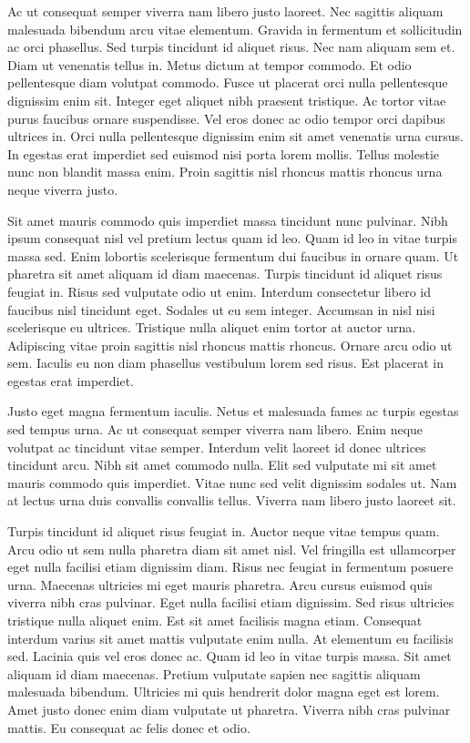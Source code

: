 \documentclass[11pt,a4paper]{article}
\begin{document}
Ac ut consequat semper viverra nam libero justo laoreet. Nec sagittis aliquam malesuada bibendum arcu vitae elementum. Gravida in fermentum et sollicitudin ac orci phasellus. Sed turpis tincidunt id aliquet risus. Nec nam aliquam sem et. Diam ut venenatis tellus in. Metus dictum at tempor commodo. Et odio pellentesque diam volutpat commodo. Fusce ut placerat orci nulla pellentesque dignissim enim sit. Integer eget aliquet nibh praesent tristique. Ac tortor vitae purus faucibus ornare suspendisse. Vel eros donec ac odio tempor orci dapibus ultrices in. Orci nulla pellentesque dignissim enim sit amet venenatis urna cursus. In egestas erat imperdiet sed euismod nisi porta lorem mollis. Tellus molestie nunc non blandit massa enim. Proin sagittis nisl rhoncus mattis rhoncus urna neque viverra justo.

Sit amet mauris commodo quis imperdiet massa tincidunt nunc pulvinar. Nibh ipsum consequat nisl vel pretium lectus quam id leo. Quam id leo in vitae turpis massa sed. Enim lobortis scelerisque fermentum dui faucibus in ornare quam. Ut pharetra sit amet aliquam id diam maecenas. Turpis tincidunt id aliquet risus feugiat in. Risus sed vulputate odio ut enim. Interdum consectetur libero id faucibus nisl tincidunt eget. Sodales ut eu sem integer. Accumsan in nisl nisi scelerisque eu ultrices. Tristique nulla aliquet enim tortor at auctor urna. Adipiscing vitae proin sagittis nisl rhoncus mattis rhoncus. Ornare arcu odio ut sem. Iaculis eu non diam phasellus vestibulum lorem sed risus. Est placerat in egestas erat imperdiet.

Justo eget magna fermentum iaculis. Netus et malesuada fames ac turpis egestas sed tempus urna. Ac ut consequat semper viverra nam libero. Enim neque volutpat ac tincidunt vitae semper. Interdum velit laoreet id donec ultrices tincidunt arcu. Nibh sit amet commodo nulla. Elit sed vulputate mi sit amet mauris commodo quis imperdiet. Vitae nunc sed velit dignissim sodales ut. Nam at lectus urna duis convallis convallis tellus. Viverra nam libero justo laoreet sit.

Turpis tincidunt id aliquet risus feugiat in. Auctor neque vitae tempus quam. Arcu odio ut sem nulla pharetra diam sit amet nisl. Vel fringilla est ullamcorper eget nulla facilisi etiam dignissim diam. Risus nec feugiat in fermentum posuere urna. Maecenas ultricies mi eget mauris pharetra. Arcu cursus euismod quis viverra nibh cras pulvinar. Eget nulla facilisi etiam dignissim. Sed risus ultricies tristique nulla aliquet enim. Est sit amet facilisis magna etiam. Consequat interdum varius sit amet mattis vulputate enim nulla. At elementum eu facilisis sed. Lacinia quis vel eros donec ac. Quam id leo in vitae turpis massa. Sit amet aliquam id diam maecenas. Pretium vulputate sapien nec sagittis aliquam malesuada bibendum. Ultricies mi quis hendrerit dolor magna eget est lorem. Amet justo donec enim diam vulputate ut pharetra. Viverra nibh cras pulvinar mattis. Eu consequat ac felis donec et odio.
\end{document}
